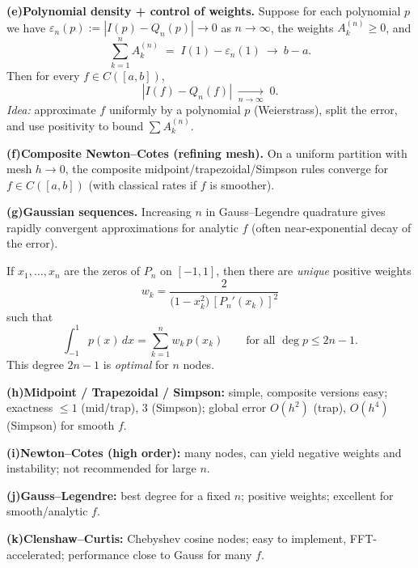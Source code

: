 \begin{problem}[CP-II-0353]
\bigskip

 \setlength{\itemsep}{0.6em}
	\par\smallskip\noindent\textbf{(e)}\quad \textbf{Polynomial density + control of weights.}
	Suppose for each polynomial $p$ we have $\varepsilon_n(p):=|I(p)-Q_n(p)|\to0$ as $n\to\infty$,
	the weights $A_k^{(n)}\ge0$, and
	\[
	\sum_{k=1}^n A_k^{(n)} \;=\; I(1)-\varepsilon_n(1)\ \longrightarrow\ b-a .
	\]
	Then for every $f\in C([a,b])$,
	\[
	|I(f)-Q_n(f)| \;\xrightarrow[n\to\infty]{}\; 0.
	\]
	\emph{Idea:} approximate $f$ uniformly by a polynomial $p$ (Weierstrass), split the error, and use positivity to bound $\sum A_k^{(n)}$.
	\par\smallskip\noindent\textbf{(f)}\quad \textbf{Composite Newton--Cotes (refining mesh).}
	On a uniform partition with mesh $h\to0$, the composite midpoint/trapezoidal/Simpson rules converge for $f\in C([a,b])$ (with classical rates if $f$ is smoother).
	\par\smallskip\noindent\textbf{(g)}\quad \textbf{Gaussian sequences.}
	Increasing $n$ in Gauss--Legendre quadrature gives rapidly convergent approximations for analytic $f$ (often near-exponential decay of the error).

\bigskip

If $x_1,\dots,x_n$ are the zeros of $P_n$ on $[-1,1]$, then there are \emph{unique} positive weights
\[
w_k=\frac{2}{\bigl(1-x_k^2\bigr)\,[P_n'(x_k)]^2}
\]
such that
\[
\int_{-1}^{1} p(x)\,dx=\sum_{k=1}^{n} w_k\,p(x_k)\qquad \text{for all } \deg p\le 2n-1.
\]
This degree $2n-1$ is \emph{optimal} for $n$ nodes.

\bigskip

 \setlength{\itemsep}{0.5em}
	\par\smallskip\noindent\textbf{(h)}\quad \textbf{Midpoint / Trapezoidal / Simpson:}
	simple, composite versions easy; exactness $\le 1$ (mid/trap), $3$ (Simpson); global error $O(h^2)$ (trap), $O(h^4)$ (Simpson) for smooth $f$.
	\par\smallskip\noindent\textbf{(i)}\quad \textbf{Newton--Cotes (high order):}
	many nodes, can yield negative weights and instability; not recommended for large $n$.
	\par\smallskip\noindent\textbf{(j)}\quad \textbf{Gauss--Legendre:}
	best degree for a fixed $n$; positive weights; excellent for smooth/analytic $f$.
	\par\smallskip\noindent\textbf{(k)}\quad \textbf{Clenshaw--Curtis:}
	Chebyshev cosine nodes; easy to implement, FFT-accelerated; performance close to Gauss for many $f$.
\end{problem}

